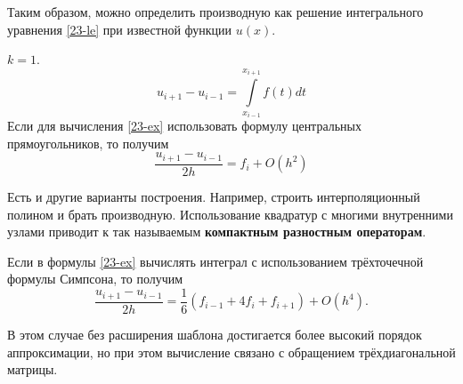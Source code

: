 Таким образом, можно определить производную как решение интегрального уравнения
\eqref{23-le} при известной функции $u(x)$.

\begin{example}
  $k = 1$.
  \begin{equation}
    \label{23-ex}
    u_{i + 1} - u_{i - 1} = \int\limits_{x_{i - 1}}^{x_{i + 1}}f(t)dt
  \end{equation}
  Если для вычисления \eqref{23-ex} использовать формулу центральных
  прямоугольников, то получим
  \begin{equation}
    \dfrac{u_{i + 1} - u_{i - 1}}{2h} = f_i + O(h^2)
  \end{equation}
\end{example}

Есть и другие варианты построения. Например, строить интерполяционный полином
и брать производную. Использование квадратур с многими внутренними узлами приводит
к так называемым \textbf{компактным разностным операторам}.

Если в формулы \eqref{23-ex} вычислять интеграл с использованием трёхточечной
формулы Симпсона, то получим
\begin{equation}
  \dfrac{u_{i + 1} - u_{i - 1}}{2h} = \dfrac{1}{6}(f_{i - 1} + 4f_i + f_{i + 1})
  + O(h^4).
\end{equation}

В этом случае без расширения шаблона достигается более высокий порядок аппроксимации,
но при этом вычисление связано с обращением трёхдиагональной матрицы.
